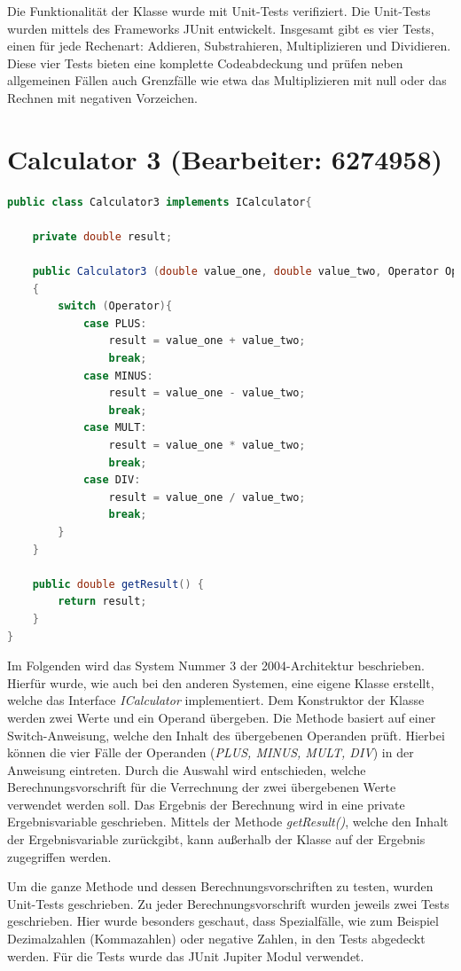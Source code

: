 Die Funktionalität der Klasse wurde mit Unit-Tests verifiziert. Die Unit-Tests wurden mittels des Frameworks JUnit entwickelt.
Insgesamt gibt es vier Tests, einen für jede Rechenart:
Addieren, Substrahieren, Multiplizieren und Dividieren. Diese vier Tests bieten eine komplette Codeabdeckung und prüfen neben allgemeinen Fällen auch Grenzfälle wie etwa das Multiplizieren mit null oder das Rechnen mit negativen Vorzeichen.


\chapter{Calculator 3 (Bearbeiter: 6274958)}

\begin{lstlisting}[language=Java,basicstyle=\scriptsize, caption= Calculator 3]
public class Calculator3 implements ICalculator{

    private double result;

    public Calculator3 (double value_one, double value_two, Operator Operator)
    {
        switch (Operator){
            case PLUS:
                result = value_one + value_two;
                break;
            case MINUS:
                result = value_one - value_two;
                break;
            case MULT:
                result = value_one * value_two;
                break;
            case DIV:
                result = value_one / value_two;
                break;
        }
    }

    public double getResult() {
        return result;
    }
}
\end{lstlisting}

Im Folgenden wird das System Nummer 3 der 2004-Architektur beschrieben. Hierfür wurde, wie auch bei den anderen Systemen, eine eigene Klasse erstellt, welche das Interface \textit{ICalculator} implementiert. Dem Konstruktor der Klasse werden zwei Werte und ein Operand übergeben. Die Methode basiert auf einer Switch-Anweisung, welche den Inhalt des übergebenen Operanden prüft. Hierbei können die vier Fälle der Operanden (\textit{PLUS, MINUS, MULT, DIV}) in der Anweisung eintreten. Durch die Auswahl wird entschieden, welche Berechnungsvorschrift für die Verrechnung der zwei übergebenen Werte verwendet werden soll.  Das Ergebnis der Berechnung wird in eine private Ergebnisvariable geschrieben. Mittels der Methode \textit{getResult()}, welche den Inhalt der Ergebnisvariable zurückgibt, kann außerhalb der Klasse auf der Ergebnis zugegriffen werden. 


Um die ganze Methode und dessen Berechnungsvorschriften zu testen, wurden Unit-Tests geschrieben. Zu jeder Berechnungsvorschrift wurden jeweils zwei Tests geschrieben. Hier wurde besonders geschaut, dass Spezialfälle, wie zum Beispiel Dezimalzahlen (Kommazahlen) oder negative Zahlen, in den Tests abgedeckt werden. Für die Tests wurde das JUnit Jupiter Modul verwendet.


